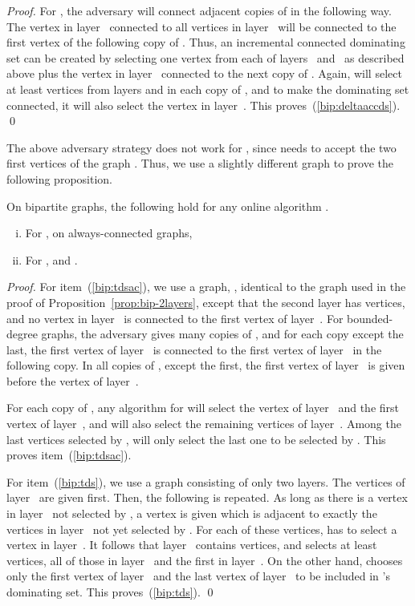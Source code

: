 \begin{proof}
For \cds, the adversary will connect adjacent copies of  in the
following way.
The vertex in layer~ connected to all vertices in layer~ will be
connected to the first vertex of the following copy of .
Thus, an incremental connected dominating set can be created by
selecting one vertex from each of layers~ and~ as described
above plus the vertex in layer~ connected to the next copy of .
Again, \A will select at least  vertices from layers 
and  in each copy of , and to make the dominating set connected,
it will also select the vertex in layer~.
This proves~(\ref{bip:deltaaccds}). 
\qed\end{proof}

The above adversary strategy does not work for \tds, since \onopt
needs to accept the two first vertices of the graph .
Thus, we use a slightly different graph to prove the following
proposition.

\begin{proposition}
\label{prop:bip-2layers-tds}
On bipartite graphs, the following hold for any online algorithm \A.
\begin{enumerate}[(i)]
\item \label{bip:tdsac}
 For \tds, on always-connected graphs, 
\item \label{bip:tds}
 For \tds,  \; and \; .
\end{enumerate}
\end{proposition}
\begin{proof}
For item~(\ref{bip:tdsac}), we use a graph, , identical to the
graph  used in the proof of Proposition~\ref{prop:bip-2layers},
except that the second layer has  vertices, and no vertex in
layer~ is connected to the first vertex of layer~.
For bounded-degree graphs, the adversary gives many copies of ,
and for each copy except the 
last, the first vertex of layer~ is connected to the first vertex
of layer~ in the following copy.
In all copies of , except the first, the first vertex of layer~
is given before the vertex of layer~.


For each copy of , any \incr algorithm for \tds will select the vertex of
layer~ and the first vertex of layer~, and
\A will also select the remaining  vertices of layer~.
Among the last  vertices selected by \A, \onopt will only
select the last one to be selected by \A.
This proves item~(\ref{bip:tdsac}).


For item~(\ref{bip:tds}), we use a graph consisting of only two layers.
The vertices of layer~ are given first.
Then, the following is repeated.
As long as there is a vertex in layer~ not selected by \A, a
vertex is given which is adjacent to exactly the vertices in layer~
not yet selected by \A.
For each of these vertices, \ALG has to select a vertex in layer~.
It follows that layer~ contains  vertices, and \ALG
selects at least  vertices, all of those in layer~ and the
first in layer~.
On the other hand, \onopt chooses only the first vertex of layer~
and the last vertex of layer~ to be included in \ALG's dominating
set.
This proves~(\ref{bip:tds}). 
\qed\end{proof}


